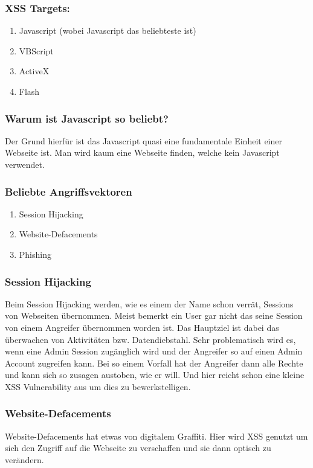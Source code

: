 \subsubsection{XSS Targets:}
\begin{enumerate}
\item Javascript (wobei Javascript das beliebteste ist) 
\item VBScript 
\item ActiveX
\item Flash
\end{enumerate}
\subsubsection{Warum ist Javascript so beliebt?}
Der Grund hierfür ist das Javascript quasi eine fundamentale Einheit einer Webseite ist. Man wird kaum eine Webseite finden, welche kein Javascript verwendet.
\subsubsection{Beliebte Angriffsvektoren}
\begin{enumerate}
\item Session Hijacking
\item Website-Defacements 
\item Phishing
\end{enumerate}
\subsubsection{Session Hijacking}
Beim Session Hijacking werden, wie es einem der Name schon verrät, Sessions von Webseiten übernommen. Meist bemerkt ein User gar nicht das seine Session von einem Angreifer übernommen worden ist. Das Hauptziel ist dabei das überwachen von Aktivitäten bzw. Datendiebstahl. Sehr problematisch wird es, wenn eine Admin Session zugänglich wird und der Angreifer so auf einen Admin Account zugreifen kann. Bei so einem Vorfall hat der Angreifer dann alle Rechte und kann sich so zusagen austoben, wie er will. Und hier reicht schon eine kleine XSS Vulnerability aus um dies zu bewerkstelligen. 
\subsubsection{Website-Defacements}
Website-Defacements hat etwas von digitalem Graffiti. Hier wird XSS genutzt um sich den Zugriff auf die Webseite zu verschaffen und sie dann optisch zu verändern. 

